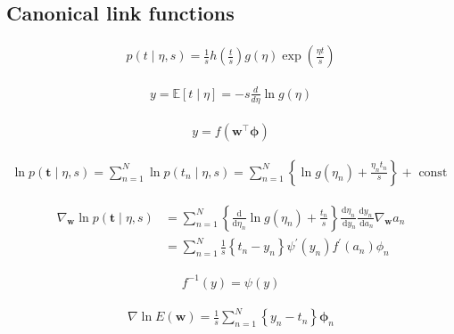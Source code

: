 \documentclass{article}
\begin{document}
\subsection{Canonical link functions}

\begin{align*}
p(t \mid \eta, s) = \frac{1}{s} h\left( \frac{t}{s} \right) g(\eta) \exp\left( \frac{\eta t}{s} \right)
\tag{5.89}
\end{align*}

\begin{align*}
y = \mathbb{E}[t \mid \eta] = -s \frac{d}{d \eta} \ln g(\eta)
\tag{5.90}
\end{align*}

\begin{align*}
y = f\left( \mathbf{w}^{\top} \boldsymbol{\phi} \right)
\tag{5.91}
\end{align*}

\begin{align*}
\ln p(\mathbf{t} \mid \eta, s)=\sum_{n=1}^{N} \ln p\left(t_{n} \mid \eta, s\right)=\sum_{n=1}^{N}\left\{\ln g\left(\eta_{n}\right)+\frac{\eta_{n} t_{n}}{s}\right\}+\text{ const }
\tag{5.92}
\end{align*}

\begin{align*}
\nabla_{\mathbf{w}} \ln p(\mathbf{t} \mid \eta, s) & =\sum_{n=1}^{N}\left\{\frac{\mathrm{d}}{\mathrm{d} \eta_{n}} \ln g\left(\eta_{n}\right)+\frac{t_{n}}{s}\right\} \frac{\mathrm{d} \eta_{n}}{\mathrm{~d} y_{n}} \frac{\mathrm{d} y_{n}}{\mathrm{~d} a_{n}} \nabla_{\mathbf{w}} a_{n} \\
& =\sum_{n=1}^{N} \frac{1}{s}\left\{t_{n}-y_{n}\right\} \psi^{\prime}\left(y_{n}\right) f^{\prime}\left(a_{n}\right) \phi_{n}
\tag{5.93}
\end{align*}

\begin{align*}
f^{-1}(y) = \psi(y)
\tag{5.94}
\end{align*}

\begin{align*}
\nabla \ln E(\mathbf{w}) = \frac{1}{s} \sum_{n=1}^{N} \left\{ y_n - t_n \right\} \boldsymbol{\phi}_n
\tag{5.95}
\end{align*}
\end{document}
